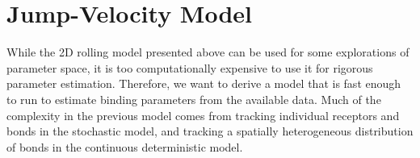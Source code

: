 
\chapter{Jump-Velocity Model}
\label{cha:jump-velocity-model}



While the 2D rolling model presented above can be used for some
explorations of parameter space, it is too computationally expensive
to use it for rigorous parameter estimation. Therefore, we want to
derive a model that is fast enough to run to estimate binding
parameters from the available data. Much of the complexity in the
previous model comes from tracking individual receptors and bonds in
the stochastic model, and tracking a spatially heterogeneous
distribution of bonds in the continuous deterministic model.


